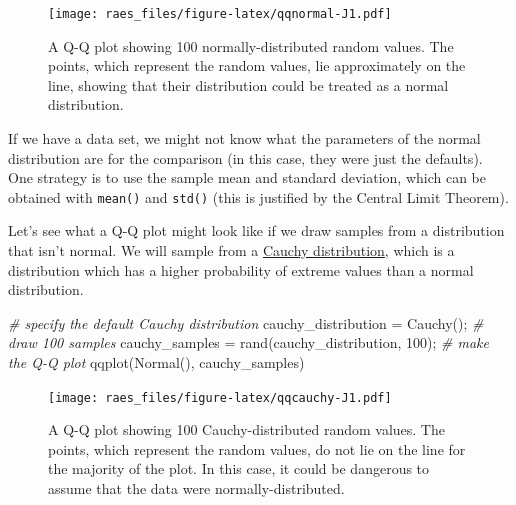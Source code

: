 \documentclass[
  11pt,
]{book}
\newenvironment{Shaded}{\begin{snugshade}}{\end{snugshade}}
\newcommand{\CommentTok}[1]{\textcolor[rgb]{0.37,0.37,0.37}{\textit{#1}}}
\newcommand{\FloatTok}[1]{\textcolor[rgb]{0.06,0.06,0.06}{#1}}
\newcommand{\NormalTok}[1]{#1}
\begin{document}
\begin{figure}
\centering
\texttt{[image: raes\_files/figure-latex/qqnormal-J1.pdf]}
\caption{\label{fig:qqnormal}A Q-Q plot showing 100 normally-distributed random values. The points, which represent the random values, lie approximately on the line, showing that their distribution could be treated as a normal distribution.}
\end{figure}

If we have a data set, we might not know what the parameters of the normal distribution are for the comparison (in this case, they were just the defaults). One strategy is to use the sample mean and standard deviation, which can be obtained with \texttt{mean()} and \texttt{std()} (this is justified by the Central Limit Theorem).

Let's see what a Q-Q plot might look like if we draw samples from a distribution that isn't normal. We will sample from a \href{https://en.wikipedia.org/wiki/Cauchy_distribution}{Cauchy distribution}, which is a distribution which has a higher probability of extreme values than a normal distribution.

\begin{Shaded}
\begin{Highlighting}[]
\CommentTok{# specify the default Cauchy distribution }
\NormalTok{cauchy_distribution = Cauchy();}
\CommentTok{# draw 100 samples}
\NormalTok{cauchy_samples = rand(cauchy_distribution, }\FloatTok{100}\NormalTok{);}
\CommentTok{# make the Q-Q plot}
\NormalTok{qqplot(Normal(), cauchy_samples) }
\end{Highlighting}
\end{Shaded}

\begin{figure}
\centering
\texttt{[image: raes\_files/figure-latex/qqcauchy-J1.pdf]}
\caption{\label{fig:qqcauchy}A Q-Q plot showing 100 Cauchy-distributed random values. The points, which represent the random values, do not lie on the line for the majority of the plot. In this case, it could be dangerous to assume that the data were normally-distributed.}
\end{figure}
\end{document}
